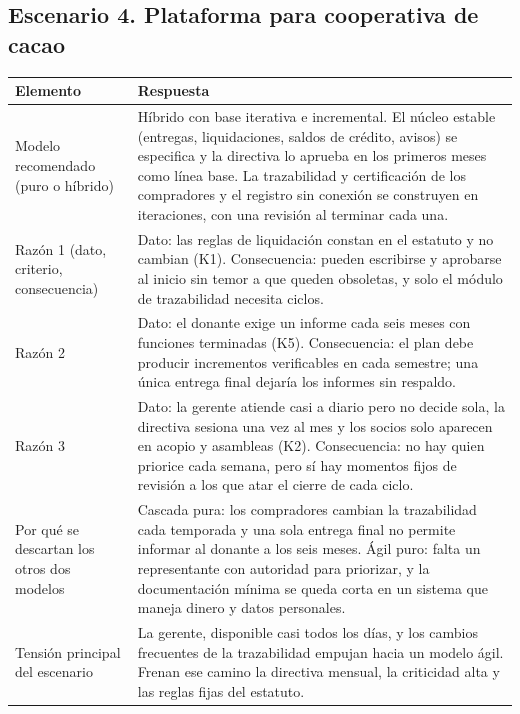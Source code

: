 \documentclass[11pt,a4paper]{article}
\begin{document}
	\subsection{Escenario 4. Plataforma para cooperativa de cacao}
	
	\small
	\begin{tabularx}{\textwidth}{|p{4.5cm}|Y|}
		\hline
		\textbf{Elemento} & \textbf{Respuesta} \\ \hline
		
		Modelo recomendado (puro o híbrido) &
		Híbrido con base iterativa e incremental. El núcleo estable (entregas, liquidaciones, saldos de crédito, avisos) se especifica y la directiva lo aprueba en los primeros meses como línea base. La trazabilidad y certificación de los compradores y el registro sin conexión se construyen en iteraciones, con una revisión al terminar cada una. \\ \hline
		
		Razón 1 (dato, criterio, consecuencia) &
		Dato: las reglas de liquidación constan en el estatuto y no cambian (K1). Consecuencia: pueden escribirse y aprobarse al inicio sin temor a que queden obsoletas, y solo el módulo de trazabilidad necesita ciclos. \\ \hline
		
		Razón 2 &
		Dato: el donante exige un informe cada seis meses con funciones terminadas (K5). Consecuencia: el plan debe producir incrementos verificables en cada semestre; una única entrega final dejaría los informes sin respaldo. \\ \hline
		
		Razón 3 &
		Dato: la gerente atiende casi a diario pero no decide sola, la directiva sesiona una vez al mes y los socios solo aparecen en acopio y asambleas (K2). Consecuencia: no hay quien priorice cada semana, pero sí hay momentos fijos de revisión a los que atar el cierre de cada ciclo. \\ \hline
		
		Por qué se descartan los otros dos modelos &
		Cascada pura: los compradores cambian la trazabilidad cada temporada y una sola entrega final no permite informar al donante a los seis meses. Ágil puro: falta un representante con autoridad para priorizar, y la documentación mínima se queda corta en un sistema que maneja dinero y datos personales. \\ \hline
		
		Tensión principal del escenario &
		La gerente, disponible casi todos los días, y los cambios frecuentes de la trazabilidad empujan hacia un modelo ágil. Frenan ese camino la directiva mensual, la criticidad alta y las reglas fijas del estatuto. \\ \hline
	\end{tabularx}
	\normalsize
	
\end{document}
